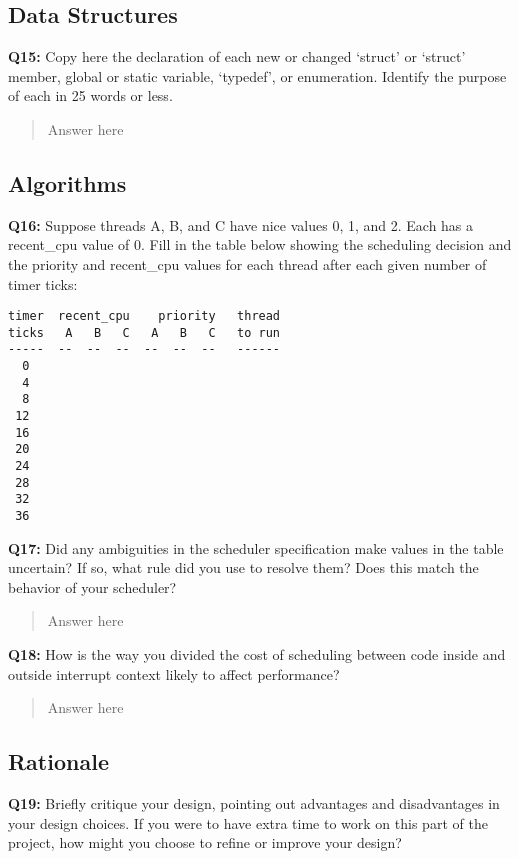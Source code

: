 \documentclass[a4paper,11pt]{paper}
\begin{document}
\subsection{Data Structures}

\textbf{Q15:} Copy here the declaration of each new or changed `struct' or
`struct' member, global or static variable, `typedef', or enumeration.  Identify
the purpose of each in 25 words or less.

\begin{quote}
  Answer here
\end{quote}

\subsection{Algorithms}

\textbf{Q16:} Suppose threads A, B, and C have nice values 0, 1, and 2.  Each
has a recent\_cpu value of 0.  Fill in the table below showing the scheduling
decision and the priority and recent\_cpu values for each thread after each
given number of timer ticks:

\small
\begin{Verbatim}[frame=single]
timer  recent_cpu    priority   thread
ticks   A   B   C   A   B   C   to run
-----  --  --  --  --  --  --   ------
  0
  4
  8
 12
 16
 20
 24
 28
 32
 36
\end{Verbatim}


\textbf{Q17:} Did any ambiguities in the scheduler specification make values in
the table uncertain?  If so, what rule did you use to resolve them?  Does this
match the behavior of your scheduler?

\begin{quote}
  Answer here
\end{quote}


\textbf{Q18:} How is the way you divided the cost of scheduling between code
inside and outside interrupt context likely to affect performance?

\begin{quote}
  Answer here
\end{quote}

\subsection{Rationale}

\textbf{Q19:} Briefly critique your design, pointing out advantages and
disadvantages in your design choices.  If you were to have extra time to work on
this part of the project, how might you choose to refine or improve your design?
\end{document}
